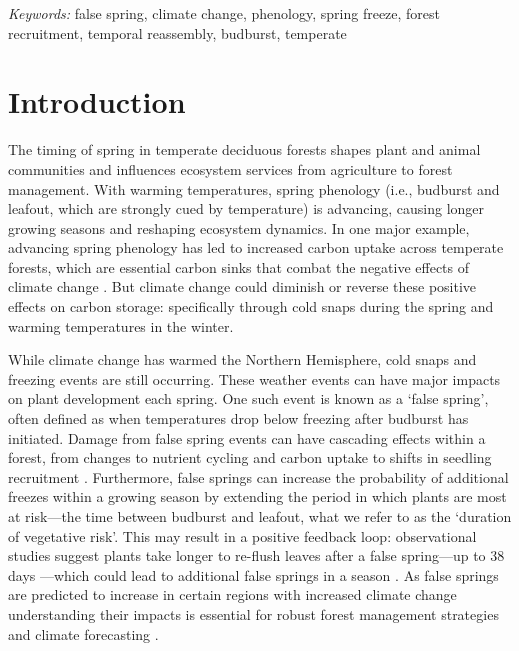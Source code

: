 \documentclass{article}\usepackage[]{graphicx}\usepackage[]{color}
\begin{document}
\vspace{2ex}
\textit{Keywords:} false spring, climate change, phenology, spring freeze, forest recruitment, temporal reassembly, budburst, temperate

\section*{Introduction}
The timing of spring in temperate deciduous forests shapes plant and animal communities and influences ecosystem services from agriculture to forest management. With warming temperatures, spring phenology (i.e., budburst and leafout, which are strongly cued by temperature) is advancing, causing longer growing seasons \citep{Chuine2001} and reshaping ecosystem dynamics. In one major example, advancing spring phenology has led to increased carbon uptake across temperate forests, which are essential carbon sinks that combat the negative effects of climate change \citep{Keenan2014}. But climate change could diminish or reverse these positive effects on carbon storage: specifically through cold snaps during the spring and warming temperatures in the winter.
  
While climate change has warmed the Northern Hemisphere, cold snaps and freezing events are still occurring. These weather events can have major impacts on plant development each spring. One such event is known as a `false spring', often defined as when temperatures drop below freezing \citep[][i.e., below -2.2$^{\circ}$C]{Schwartz2002} after budburst has initiated. Damage from false spring events can have cascading effects within a forest, from changes to nutrient cycling and carbon uptake to shifts in seedling recruitment \citep{Hufkens2012, Klosterman2018, Richardson2013}. Furthermore, false springs can increase the probability of additional freezes within a growing season by extending the period in which plants are most at risk---the time between budburst and leafout, what we refer to as the `duration of vegetative risk'. This may result in a positive feedback loop: observational studies suggest plants take longer to re-flush leaves after a false spring---up to 38 days \citep{Augspurger2009, Augspurger2013, Gu2008, Menzel2015}---which could lead to additional false springs in a season \citep{Augspurger2009}. As false springs are predicted to increase in certain regions with increased climate change \citep{Ault2015, Liu2018, Zohner2020} understanding their impacts is essential for robust forest management strategies and climate forecasting \citep{OBrien2019}. 
  
\end{document}

